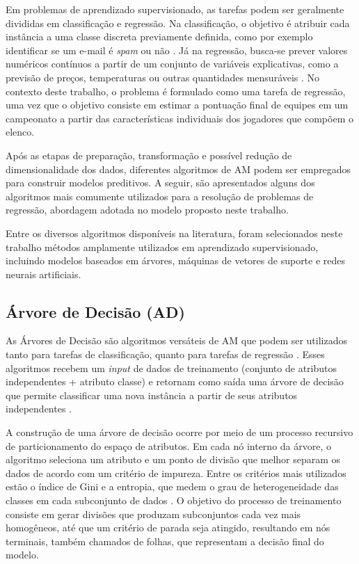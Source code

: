 Em problemas de aprendizado supervisionado, as tarefas podem ser geralmente divididas em classificação e regressão. Na classificação, o objetivo é atribuir 
cada instância a uma classe discreta previamente definida, como por exemplo identificar se um e-mail é \textit{spam} ou não \cite{Geron2019}. 
Já na regressão, busca-se prever valores numéricos 
contínuos a partir de um conjunto de variáveis explicativas, como a previsão de preços, temperaturas ou outras 
quantidades mensuráveis \cite{Geron2019}. No contexto deste trabalho, o problema é formulado como uma tarefa de regressão, 
uma vez que o objetivo consiste em estimar a pontuação final de equipes em um campeonato a partir das características 
individuais dos jogadores que compõem o elenco.

Após as etapas de preparação, transformação e possível redução de dimensionalidade dos dados, diferentes algoritmos de AM podem ser 
empregados para construir modelos preditivos. A seguir, são apresentados alguns dos algoritmos mais comumente utilizados para a resolução de problemas de 
regressão, abordagem adotada no modelo proposto neste trabalho.

Entre os diversos algoritmos disponíveis na literatura, foram selecionados neste trabalho métodos amplamente utilizados em aprendizado supervisionado, 
incluindo modelos baseados em árvores, máquinas de vetores de suporte e redes neurais artificiais.

\subsection{Árvore de Decisão (AD)}

As Árvores de Decisão são algoritmos versáteis de AM que podem ser utilizados tanto para tarefas de classificação, quanto para tarefas de regressão \cite{Geron2019}. 
Esses algoritmos recebem um \textit{input} de dados de treinamento (conjunto de atributos independentes + atributo classe) e retornam como saída uma 
árvore de decisão que permite classificar uma nova instância a partir de seus atributos independentes \cite{Geron2019}.

A construção de uma árvore de decisão ocorre por meio de um processo recursivo de particionamento do espaço de atributos. Em cada nó interno da árvore, 
o algoritmo seleciona um atributo e um ponto de divisão que melhor separam os dados de acordo com um critério de impureza. Entre os critérios 
mais utilizados estão o índice de Gini e a entropia, que medem o grau de heterogeneidade das classes em cada subconjunto de dados \cite{Geron2019}. 
O objetivo do processo de treinamento consiste em gerar divisões que produzam subconjuntos cada vez mais homogêneos, até que um 
critério de parada seja atingido, resultando em nós terminais, também chamados de folhas, que representam a decisão final do modelo.

